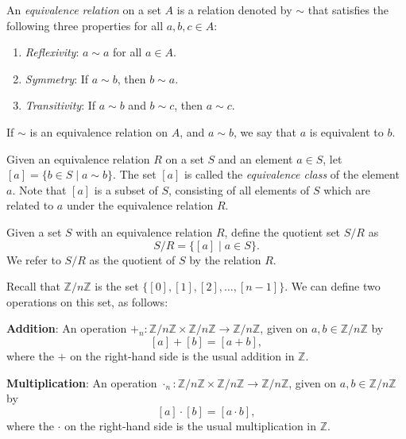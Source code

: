 \documentclass{article}
\begin{document}
\begin{definition}
    An \emph{equivalence relation} on a set \( A \) is a relation denoted by \( \sim \) that satisfies the following three properties for all \( a, b, c \in A \):
    \begin{enumerate}
        \item \emph{Reflexivity}: \( a \sim a \) for all \( a \in A \).
        \item \emph{Symmetry}: If \( a \sim b \), then \( b \sim a \).
        \item \emph{Transitivity}: If \( a \sim b \) and \( b \sim c \), then \( a \sim c \).
    \end{enumerate}
    If \( \sim \) is an equivalence relation on \( A \), and \( a \sim b \), we say that \( a \) is equivalent to \( b \).
\end{definition}

\begin{definition}
Given an equivalence relation \( R \) on a set \( S \) and an element \( a \in S \), let \([a] = \{ b \in S \mid a \sim b \}\). The set \([a]\) is called the \emph{equivalence class} of the element \( a \). Note that \([a]\) is a subset of \( S \), consisting of all elements of \( S \) which are related to \( a \) under the equivalence relation \( R \).
\end{definition}

\begin{definition}
Given a set \( S \) with an equivalence relation \( R \), define the quotient set \( S/R \) as
\[ S/R = \{ [a] \mid a \in S \}. \] 
We refer to \( S/R \) as the quotient of \( S \) by the relation \( R \).
\end{definition}

\begin{definition}
    Recall that \( \mathbb{Z}/n\mathbb{Z} \) is the set \( \{[0], [1], [2], \ldots, [n-1]\} \). We can define two operations on this set, as follows:

    \textbf{Addition}: An operation \( +_n \colon \mathbb{Z}/n\mathbb{Z} \times \mathbb{Z}/n\mathbb{Z} \to \mathbb{Z}/n\mathbb{Z} \), given on \( a, b \in \mathbb{Z}/n\mathbb{Z} \) by
    \[ [a] + [b] = [a + b], \]
    where the \( + \) on the right-hand side is the usual addition in \( \mathbb{Z} \).

    \textbf{Multiplication}: An operation \( \cdot_n \colon \mathbb{Z}/n\mathbb{Z} \times \mathbb{Z}/n\mathbb{Z} \to \mathbb{Z}/n\mathbb{Z} \), given on \( a, b \in \mathbb{Z}/n\mathbb{Z} \) by
    \[ [a] \cdot [b] = [a \cdot b], \]
    where the \( \cdot \) on the right-hand side is the usual multiplication in \( \mathbb{Z} \).
\end{definition}
\end{document}
